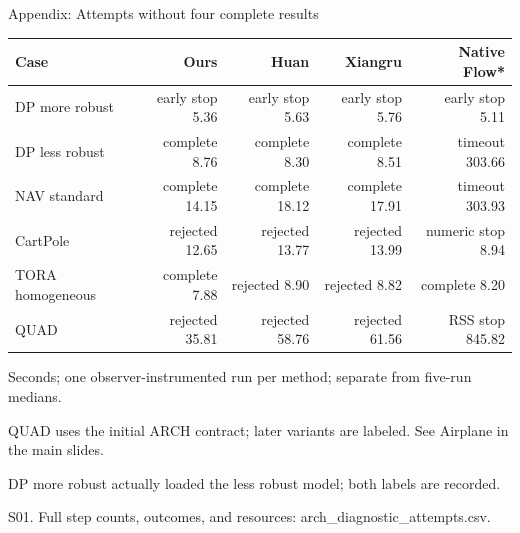 \documentclass[aspectratio=169,11pt]{beamer}
\newcommand{\src}[1]{\par\vfill{\fontsize{7}{9}\selectfont\color{gray}#1\par}}
\begin{document}
\begin{frame}[t]{Appendix: Attempts without four complete results}
\relax
\relax
{\footnotesize\setlength{\tabcolsep}{3.2pt}\renewcommand{\arraystretch}{1.18}
\noindent\begin{tabular*}{\linewidth}{@{\extracolsep{\fill}}lrrrr@{}}\toprule
\textbf{Case} & \textbf{Ours} & \textbf{Huan} & \textbf{Xiangru} & \textbf{Native Flow*}\\ \midrule
DP more robust & early stop 5.36 & early stop 5.63 & early stop 5.76 & early stop 5.11\\
DP less robust & complete 8.76 & complete 8.30 & complete 8.51 & timeout 303.66\\
NAV standard & complete 14.15 & complete 18.12 & complete 17.91 & timeout 303.93\\
CartPole & rejected 12.65 & rejected 13.77 & rejected 13.99 & numeric stop 8.94\\
TORA homogeneous & complete 7.88 & rejected 8.90 & rejected 8.82 & complete 8.20\\
QUAD & rejected 35.81 & rejected 58.76 & rejected 61.56 & RSS stop 845.82\\
\bottomrule\end{tabular*}\par{}}\vspace{0.15cm}Seconds; one observer-instrumented run per method; separate from five-run medians.\par{}QUAD uses the initial ARCH contract; later variants are labeled. See Airplane in the main slides.\par{}DP more robust actually loaded the less robust model; both labels are recorded.
\src{S01. Full step counts, outcomes, and resources: arch\_diagnostic\_attempts.csv.}
\end{frame}
\end{document}
